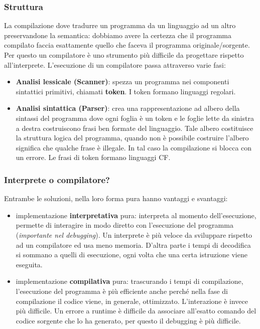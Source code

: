 \documentclass[oneside,a4paper,11pt]{book}
\theoremstyle{italicstyle}
\theoremstyle{normStyle}
\begin{document}
\subsubsection{Struttura}
La compilazione dove tradurre un programma da un linguaggio 
ad un altro preservandone la semantica:
dobbiamo avere la certezza che il programma compilato faccia
esattamente quello che faceva il programma originale/sorgente.
Per questo un compilatore è uno strumento più difficile da progettare 
rispetto all'interprete. L'esecuzione di un compilatore passa 
attraverso varie fasi:
\begin{itemize}
  \item \textbf{Analisi lessicale (Scanner)}: spezza un programma 
  nei componenti sintattici primitivi, chiamati \textbf{token}. 
  I token formano linguaggi regolari.
  \item \textbf{Analisi sintattica (Parser)}: crea una rappresentazione 
  ad albero della sintassi del programma dove ogni foglia 
  è un token e le foglie lette da sinistra a destra costruiscono 
  frasi ben formate del linguaggio. Tale albero costituisce la 
  struttura logica del programma, quando non è possibile costruire 
  l'albero significa che qualche frase è illegale. In 
  tal caso la compilazione si blocca con un errore. Le frasi 
  di token formano linguaggi CF.
\end{itemize}
\subsubsection{Interprete o compilatore?}
Entrambe le soluzioni, nella loro forma pura hanno vantaggi 
e svantaggi:
\begin{itemize}
  \item implementazione \textbf{interpretativa} pura: interpreta 
  al momento dell'esecuzione, permette di interagire in modo diretto con l'esecuzione 
  del programma (\textit{importante nel debugging}). Un interprete 
  è più veloce da sviluppare rispetto ad un compilatore ed usa 
  meno memoria. D'altra parte i tempi di decodifica si sommano
  a quelli di esecuzione, ogni volta che una certa istruzione 
  viene eseguita.
  \item implementazione \textbf{compilativa} pura: trascurando 
  i tempi di compilazione, l'esecuzione del programma è più efficiente 
  anche perché nella fase di compilazione il codice viene, in generale,
  ottimizzato. L'interazione è invece più difficile. Un errore 
  a runtime è difficile da associare all'esatto comando del codice 
  sorgente che lo ha generato, per questo il debugging è più 
  difficile.
\end{itemize}
\end{document}
